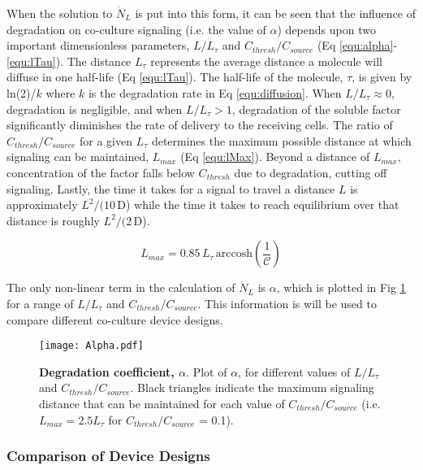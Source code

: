 When the solution to $\dot{N}_{L}$ is put into this form, it can be seen that the influence of degradation on co-culture signaling (i.e. the value of $\alpha$) depends upon two important dimensionless parameters, $L/L_{\tau}$ and $C_{thresh}/C_{source}$ (Eq \ref{equ:alpha}-\ref{equ:lTau}). The distance $L_{\tau}$ represents the average distance a molecule will diffuse in one half-life (Eq \ref{equ:lTau}). The half-life of the molecule, $\tau$, is given by ln(2)/$k$ where $k$ is the degradation rate in Eq \ref{equ:diffusion}. When $L/L_{\tau} \approx 0$, degradation is negligible, and when $L/L_{\tau} > 1$, degradation of the soluble factor significantly diminishes the rate of delivery to the receiving cells. The ratio of $C_{thresh}/C_{source}$ for a given $L_{\tau}$ determines the maximum possible distance at which signaling can be maintained, $L_{max}$ (Eq \ref{equ:lMax}). Beyond a distance of $L_{max}$, concentration of the factor falls below $C_{thresh}$ due to degradation, cutting off signaling. Lastly, the time it takes for a signal to travel a distance $L$ is approximately $L^{2}/(10\,$D) while the time it takes to reach equilibrium over that distance is roughly $L^{2}/(2\,$D).

\begin{equation}
L_{max} = 0.85 \, L_{\tau} \, \textrm{arccosh}\left(\frac{1}{\mathcal{C}}\right)
\label{equ:lMax}
\end{equation}

The only non-linear term in the calculation of $\dot{N}_{L}$ is $\alpha$, which is plotted in Fig \ref{chap1:fig:alpha} for a range of $L/L_{\tau}$ and $C_{thresh}/C_{source}$. This information is will be used to compare different co-culture device designs.

\begin{figure}[!t]
\centering
\texttt{[image: Alpha.pdf]}
\caption{\textbf{Degradation coefficient, $\alpha$}. Plot of $\alpha$, for different values of $L/L_{\tau}$ and $C_{thresh}/C_{source}$. Black triangles indicate the maximum signaling distance that can be maintained for each value of $C_{thresh}/C_{source}$ (i.e. $L_{max} = 2.5 L_{\tau}$ for $C_{thresh}/C_{source}$ = 0.1).}
\label{chap1:fig:alpha}
\end{figure}

\subsubsection{Comparison of Device Designs}

